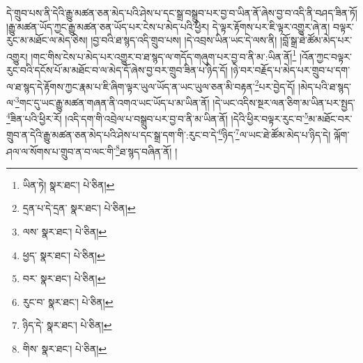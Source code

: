 དེ་གྲུབ་པས་ནི་དེའི་རྒྱུ་མཚན་ཅན་མེད་པའི་ཤེས་པ་དང་སྒྲ་བསྒྲུབ་པར་བྱ་བ་ཡིན་ནོ་ཞེས་བྱ་བ་འདི་ནི་བཤད་ཟིན་ཏོ། །རྒྱུ་མཚན་ཡོད་ཀྱང་རྒྱུ་མཚན་ཅན་ཡོད་པར་ངེས་པ་མེད་པའི་ཕྱིར། དེ་ལྟར་རྟོགས་པར་ཇི་ལྟར་འགྱུར་ཞེ་ན། བལྟར་རུང་མ་མཐོང་ལ་མེད་ཅེས། །བྱ་བའི་ཐ་སྙད་འདི་གྲུབ་པས། །དེ་འབྲས་ཡིན་ཡང་དེ་ལས་ནི། །བློ་སྒྲ་ཐེ་ཚོམ་མེད་པར་འགྱུར། །གང་གིས་ངེས་པ་མེད་པར་འགྱུར་བ་ཐ་སྙད་ལ་གདོད་གཞུག་པར་བྱ་བ་ནི་མ་:ཡིན་ནོ།\footnote{ཡིན་ཏེ།  སྣར་ཐང་།  པེ་ཅིན། } །འོན་ཀྱང་བལྟར་རུང་བའི་དངོས་པོ་མ་མཐོང་བ་ལ་མེད་དོ་ཞེས་བྱ་བར་གྲུབ་ཟིན་པ་ཉིད་དོ། །ཉེ་བར་བརྗོད་པ་མེད་པར་གྲུབ་པ་དག་ལ་ཐ་སྙད་དེ་རྟོགས་ཀྱང་རྣམ་པ་ཇི་ཞིག་ལྟར་ཡུལ་ཡོད་ན་ཡང་ཡུལ་ཅན་མི་བརྟན་\footnote{དྲན་པ་དེ་དྲན་  སྣར་ཐང་།  པེ་ཅིན། }པར་བྱེད་དོ། །མེད་པའི་ཐ་སྙད་ལ་\footnote{ལས་  སྣར་ཐང་།  པེ་ཅིན། }གང་དུ་ཡང་རྒྱུ་མཚན་གཞན་ནི་འགའ་ཡང་ཡོད་པ་མ་ཡིན་ནོ། །དེ་ཡང་འདིས་སྔར་ལན་ཅིག་མ་ཡིན་པར་སྤྱད་\footnote{ཕྱད་  སྣར་ཐང་།  པེ་ཅིན། }ཟིན་པའི་ཕྱིར་རོ། །འདི་དག་གི་འབྲེལ་པ་བསྒྲུབ་པར་བྱ་བ་ནི་མ་ཡིན་ནོ། །དེའི་ཕྱིར་བལྟར་རུང་བ་\footnote{བར་  སྣར་ཐང་།  པེ་ཅིན། }མ་མཐོང་བར་གྲུབ་ན་དེའི་རྒྱུ་མཚན་ཅན་མེད་པའི་ཤེས་པ་དང་སྒྲ་དག་གི་:རུང་བ་དེ་\footnote{རུང་བ་  སྣར་ཐང་།  པེ་ཅིན། }ཉིད་\footnote{ཉིད་དེ་  སྣར་ཐང་།  པེ་ཅིན། }ལ་ཡང་ཐེ་ཚོམ་མེད་པ་ཉིད་དེ། ལྐོག་ཤལ་ལ་སོགས་པ་གྲུབ་ན་བ་ལང་གི་\footnote{གིས་  སྣར་ཐང་།  པེ་ཅིན། }ཐ་སྙད་བཞིན་ནོ། །
